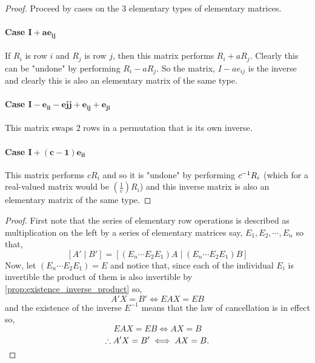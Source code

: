 \documentclass[../MathsNotesBase.tex]{subfiles}
\begin{document}
{		\bigskip	
		\begin{proof} Proceed by cases on the 3 elementary types of elementary matrices.
		~\paragraph{Case $\bm{ I + ae_{ij} }$}  If $R_i$ is row $i$ and $R_j$ is row $j$, then this matrix performs $R_i + aR_j$. Clearly this can be "undone" by performing $R_i - aR_j$. So the matrix, $I - ae_{ij}$ is the inverse and clearly this is also an elementary matrix of the same type.
		\paragraph{Case $\bm{ I - e_{ii} - e{jj} + e_{ij} + e_{ji} }$} This matrix swaps 2 rows in a permutation that is its own inverse.
		\paragraph{Case $\bm{ I + (c - 1)e_{ii} }$} This matrix performs $cR_i$ and so it is "undone" by performing ${c}^{-1}R_i$ (which for a real-valued matrix would be $\left(\frac{1}{c}\right)R_i$) and this inverse matrix is also an elementary matrix of the same type. 
		\end{proof}
		
		\bigskip
		\begin{proof}
		First note that the series of elementary row operations is described as multiplication on the left by a series of elementary matrices say, $E_1, E_2, \cdots , E_n$ so that,
		\[ [A' \;\vert\; B'] = [(E_n\cdots E_2E_1)A \;\vert\; (E_n\cdots E_2E_1)B] \]
		Now, let $(E_n\cdots E_2E_1) = E$ and notice that, since each of the individual $E_i$ is invertible the product of them is also invertible by \autoref{prop:existence_inverse_product} so,
		\[ A'X = B' \iff EAX = EB \]
		and the existence of the inverse $E^{-1}$ means that the law of cancellation is in effect so,
		\[ EAX = EB \iff AX = B \]
		\[ \therefore A'X = B' \iff AX = B. \qedhere \]
		\end{proof}
	
}
\end{document}
